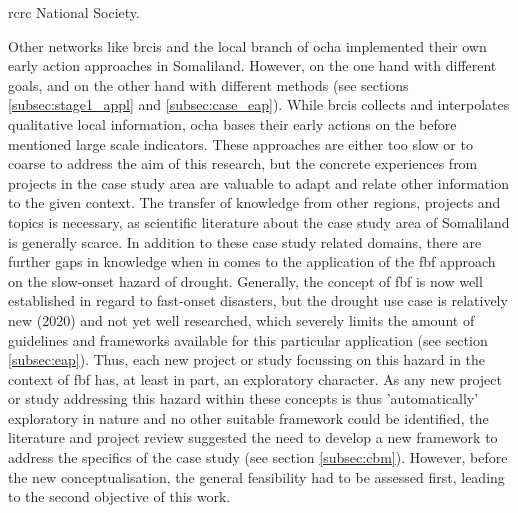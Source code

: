 \acrshort{rcrc} National Society.\newline

Other networks like \acrlong{brcis} and the local branch of \acrshort{ocha} implemented their own early action approaches in Somaliland. However, on the one hand with different goals, and on the other hand with different methods (see sections \ref{subsec:stage1_appl} and \ref{subsec:case_eap}). While \acrshort{brcis} collects and interpolates qualitative local information, \acrshort{ocha} bases their early actions on the before mentioned large scale indicators. These approaches are either too slow or to coarse to address the aim of this research, but the concrete experiences from projects in the case study area are valuable to adapt and relate other information to the given context. The transfer of knowledge from other regions, projects and topics is necessary, as scientific literature about the case study area of Somaliland is generally scarce. In addition to these case study related domains, there are further gaps in knowledge when in comes to the application of the \acrshort{fbf} approach on the slow-onset hazard of drought. Generally, the concept of \acrshort{fbf} is now well established in regard to fast-onset disasters, but the drought use case is relatively new (2020) and not yet well researched, which severely limits the amount of guidelines and frameworks available for this particular application (see section \ref{subsec:eap}). Thus, each new project or study focussing on this hazard in the context of \acrshort{fbf} has, at least in part, an exploratory character.\newline
As any new project or study addressing this hazard within these concepts is thus 'automatically' exploratory in nature and no other suitable framework could be identified, the literature and project review suggested the need to develop a new framework to address the specifics of the case study (see section \ref{subsec:cbm}). However, before the new conceptualisation, the general feasibility had to be assessed first, leading to the second objective of this work.


